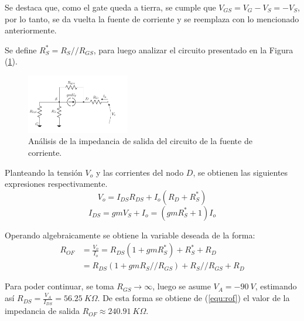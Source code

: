 Se destaca que, como el gate queda a tierra, se cumple que $V_{GS} = V_G - V_S = - V_S$, por lo tanto, se da vuelta la fuente de corriente y se reemplaza con lo mencionado anteriormente. 

Se define $R_S^* = R_S // R_{GS}$, para luego analizar el circuito presentado en la Figura (\ref{fig:incfuente2}).
\begin{figure}[H]
\centering
\hspace*{2cm}
	\includegraphics[width=0.4\textwidth, page=2]{Imagenes/ModeloIncremental.pdf}
	\caption{Análisis de la impedancia de salida del circuito de la fuente de corriente.}
\label{fig:incfuente2}
\end{figure}

Planteando la tensión $V_o$ y las corrientes del nodo $D$, se obtienen las siguientes expresiones respectivamente.
\begin{equation*}
	V_o = I_{DS} R_{DS} + I_o \left( R_D + R_S^* \right)
\end{equation*}
\begin{equation*}
	I_{DS} = gm V_S + I_o = \left( gm R_S^* + 1 \right) I_o
\end{equation*}

Operando algebraicamente se obtiene la variable deseada de la forma:
\begin{equation}
\begin{split}
	R_{OF} & = \frac{V_o}{I_o} = R_{DS} \left( 1 + gm R_S^* \right) + R_S^* + R_D \\
		   & = R_{DS} \left( 1 + gm R_S//R_{GS} \right) + R_S//R_{GS} + R_D
\end{split}
\label{equ:rof}
\end{equation}

Para poder continuar, se toma $R_{GS} \longrightarrow \infty$, luego se asume $V_A = -90 \ V$, estimando así $R_{DS} = \frac{V_A}{I_{DS}} = 56.25 \ K\Omega$. De esta forma se obtiene de (\ref{equ:rof}) el valor de la impedancia de salida $R_{OF} \approx 240.91 \ K\Omega$.


